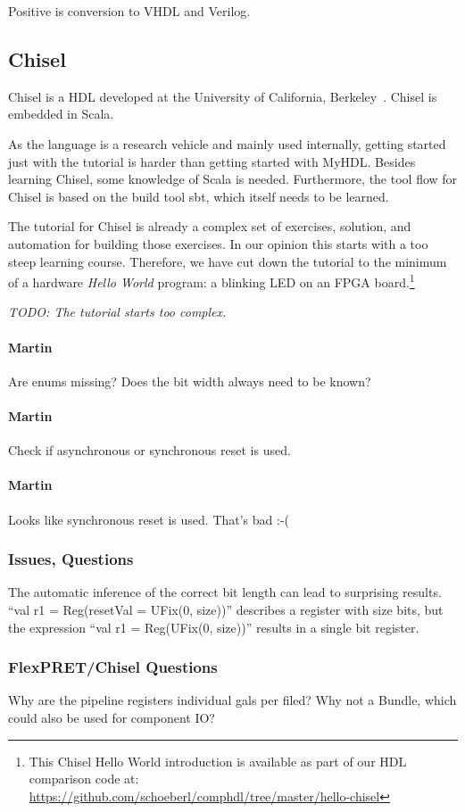 \documentclass[a4paper, conference]{IEEEtran}
\newcommand{\todo}[1]{{\emph{TODO: #1}}}
\newcommand{\comment}[3]{\paragraph*{\textbf{#1}}{\color{#3}#2}}
\newcommand{\martin}[1]{\comment{Martin}{#1}{Blue}}
\begin{document}
Positive is conversion to VHDL and Verilog.

\subsection{Chisel}

Chisel is a HDL developed at the University of California, Berkeley~\cite{chisel:dac2012}.
Chisel is embedded in Scala.

As the language is a research vehicle and mainly used internally, getting
started just with the tutorial is harder than getting started with MyHDL.
Besides learning Chisel, some knowledge of Scala is needed. Furthermore,
the tool flow for Chisel is based on the build tool sbt, which itself needs to
be learned.

The tutorial for Chisel is already a complex set of exercises, solution, and
automation for building those exercises. In our opinion this starts with a
too steep learning course. Therefore, we have cut down the tutorial to
the minimum of a hardware \emph{Hello World} program: a blinking LED
on an FPGA board.\footnote{This Chisel Hello World introduction is
available as part of our HDL comparison code at:
\url{https://github.com/schoeberl/comphdl/tree/master/hello-chisel}}

\todo{The tutorial starts too complex.}

\martin{Are enums missing? Does the bit width always need to be known?}

\martin{Check if asynchronous or synchronous reset is used.}

\martin{Looks like synchronous reset is used. That's bad :-(}

\subsubsection{Issues, Questions}

The automatic inference of the correct bit length can lead to surprising
results. ``val r1 = Reg(resetVal = UFix(0, size))'' describes a register with
size bits, but the expression ``val r1 = Reg(UFix(0, size))'' results in a single
bit register.

\subsubsection{FlexPRET/Chisel Questions}

Why are the pipeline registers individual gals per filed? Why not a Bundle,
which could also be used for component IO?
\end{document}
